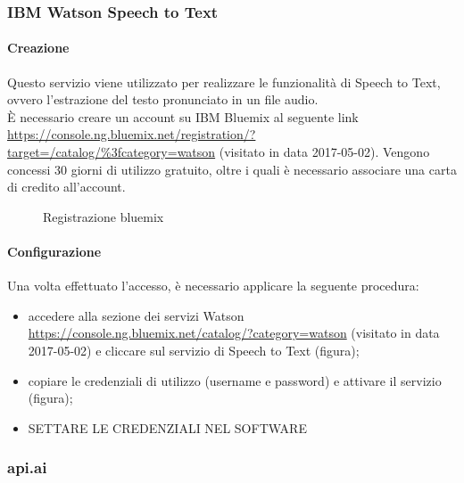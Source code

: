 \subsubsection{IBM Watson Speech to Text}
\paragraph{Creazione}
Questo servizio viene utilizzato per realizzare le funzionalità di Speech to Text, ovvero l'estrazione del testo pronunciato in un file audio.\\
È necessario creare un account su IBM Bluemix al seguente link \url{https://console.ng.bluemix.net/registration/?target=/catalog/\%3fcategory=watson} (visitato in data 2017-05-02). Vengono concessi 30 giorni di utilizzo gratuito, oltre i quali è necessario associare una carta di credito all'account.
\begin{figure}[h]
	\caption{Registrazione bluemix}
\end{figure}
\paragraph{Configurazione}
Una volta effettuato l'accesso, è necessario applicare la seguente procedura:
\begin{itemize}
	\item accedere alla sezione dei servizi Watson \url{https://console.ng.bluemix.net/catalog/?category=watson} (visitato in data 2017-05-02) e cliccare sul servizio di Speech to Text (figura);
	\item copiare le credenziali di utilizzo (username e password) e attivare il servizio (figura);
	\item SETTARE LE CREDENZIALI NEL SOFTWARE
\end{itemize}
\subsubsection{api.ai}
